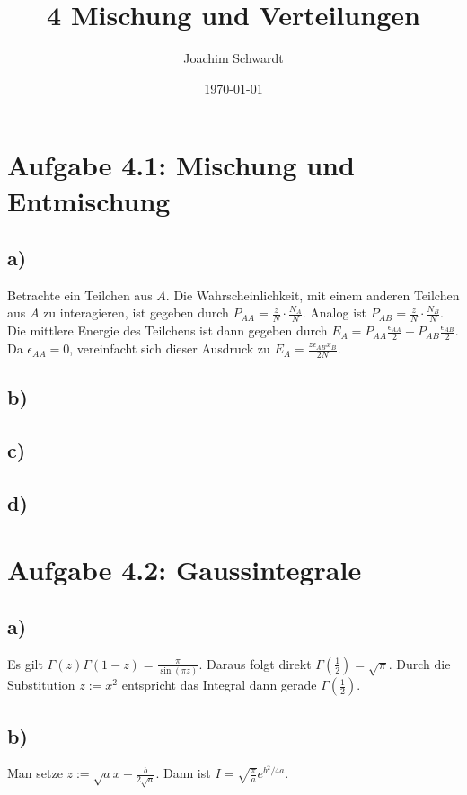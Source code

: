 \documentclass[a4paper,12pt]{article}
\newcommand{\kla}{}
\begin{document}
\title{4 Mischung und Verteilungen}
\author{Joachim Schwardt}
\date{\today}
\maketitle

\section*{Aufgabe 4.1: Mischung und Entmischung}
\subsection*{a)}Betrachte ein Teilchen aus $A$. Die Wahrscheinlichkeit, mit einem anderen Teilchen aus $A$ zu interagieren, ist gegeben durch $P_{AA}=\frac{z}{N}\cdot\frac{N_A}{N}$. Analog ist $P_{AB}=\frac{z}{N}\cdot\frac{N_B}{N}$. Die mittlere Energie des Teilchens ist dann gegeben durch $E_A=P_{AA}\frac{\epsilon_{AA}}{2}+P_{AB}\frac{\epsilon_{AB}}{2}$. Da $\epsilon_{AA}=0$, vereinfacht sich dieser Ausdruck zu $E_A=\frac{z\epsilon_{AB}x_B}{2N}$.
\subsection*{b)}
\subsection*{c)}
\subsection*{d)}
\section*{Aufgabe 4.2: Gaussintegrale}
\subsection*{a)}Es gilt $\Gamma(z)\Gamma(1-z)=\frac{\pi}{\sin(\pi z)}$. Daraus folgt direkt $\Gamma\kla\left( {\frac{1}{2}} \right)=\sqrt{\pi}$. Durch die Substitution $z:=x^2$ entspricht das Integral dann gerade $\Gamma\kla\left( {\frac{1}{2}} \right)$.
\subsection*{b)}Man setze $z:=\sqrt{a}x+\frac{b}{2\sqrt{a}}$. Dann ist $I=\sqrt{\frac{\pi}{a}}e^{b^2/4a}$.
\end{document}
